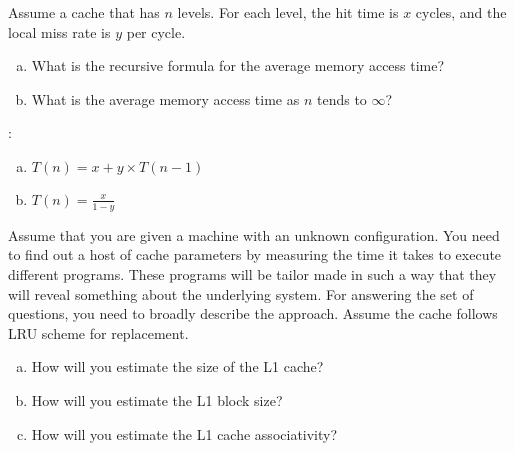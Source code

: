 \begin{ExerciseList}
\Exercise [difficulty=1]
Assume a cache that has $n$ levels. For each level, the hit time is $x$ cycles, and the local miss rate is $y$ per cycle.
\begin{enumerate}[(a) ]
\item
What is the recursive formula for the average memory access time? 
\item What is the average memory access time as $n$ tends to $\infty$?
\end{enumerate}

\Answer:
\begin{enumerate}[(a) ]
\item 
$T(n) = x +y\times T(n-1)$
\item 
$T(n) = \frac{x}{1-y}$
\end{enumerate}




\Exercise [difficulty=2]
Assume that you are given a machine with an unknown configuration.
You need to find out a host
of cache parameters by measuring the time it takes to execute different programs.
These programs will be tailor made in such a way that they will reveal something
about the underlying system. 
For answering the set of questions, you need to broadly describe
the approach. Assume the cache follows LRU scheme for replacement.
\begin{enumerate}[(a) ]
	\item How will you estimate the size of the L1 cache?
	\item How will you estimate the L1 block size?
	\item How will you estimate the L1 cache associativity?
\end{enumerate}


\end{ExerciseList}
